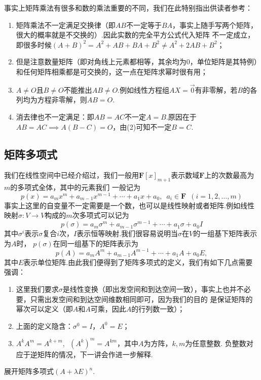 事实上矩阵乘法有很多和数的乘法重要的不同，我们在此特别指出供读者参考：
\begin{enumerate}[label=(\arabic*)]
    \item 矩阵乘法不一定满足交换律（即$AB$不一定等于$BA$，事实上随手写两个矩阵，很大的概率就是不交换的）.因此实数的完全平方公式代入矩阵
    不一定成立，即很多时候$(A+B)^2=A^2+AB+BA+B^2\neq A^2+2AB+B^2$；

    \item 但是注意数量矩阵（即对角线上元素都相等，其余均为0，单位矩阵是其特例）和任何矩阵相乘都是可交换的，这一点在矩阵求幂时很有用；
    \item $A\neq O$且$B\neq O$不能推出$AB\neq O$.例如线性方程组$AX = \vec{0}$有非零解，若$B$的各列均为方程非零解，则$AB = O$.
    \item 消去律也不一定满足：即$AB = AC$不一定$A = B$.原因在于$AB=AC \implies A(B-C)=O$，由(2)可知不一定$B = C$.
\end{enumerate}

\subsection{矩阵多项式}
我们在线性空间中已经介绍过，我们一般用$\mathbf{F}[x]_{m+1}$表示数域$\mathbf{F}$上的次数最高为$m$的多项式全体，其中的元素我们
一般记为
\[p(x)=a_mx^m+a_{m-1}x^{m-1}+\cdots+a_1x+a_0,\enspace a_i\in\mathbf{F}\enspace(i=1,2,\ldots,m)\]
事实上这里的自变量不一定需要是一个数，也可以是线性映射或者矩阵.例如线性映射$\sigma:V\to V$构成的$m$次多项式可以记为
\[p(\sigma)=a_m\sigma^m+a_{m-1}\sigma^{m-1}+\cdots+a_1\sigma+a_0I\]
其中$\sigma^i$表示$\sigma$复合$i$次，$I$表示恒等映射.我们很容易说明当$\sigma$在$V$的一组基下矩阵表示为$A$时，
$p(\sigma)$在同一组基下的矩阵表示为
\[p(A)=a_mA^m+a_{m-1}A^{m-1}+\cdots+a_1A+a_0E,\]
其中$E$表示单位矩阵.由此我们便得到了矩阵多项式的定义，我们有如下几点需要强调：
\begin{enumerate}
    \item 这里我们要求$\sigma$是线性变换（即出发空间和到达空间一致），事实上也并不必要，只需出发空间和到达空间维数相同即可，因为我们的目的
    是保证矩阵的幂次可以定义（即$A$和$A$可乘，因此$A$的行列数一致）；
    \item 上面的定义隐含：$\sigma^0 = I$，$A^0=E$；
    \item $A^kA^m=A^{k+m},\enspace (A^k)^m=A^{km}$，其中$A$为方阵，$k,m$为任意整数. 负整数对应于逆矩阵的情况，下一讲会作进一步解释.
\end{enumerate}
\begin{example}
    展开矩阵多项式$(A+\lambda E)^n$.
\end{example}
\begin{solution}

\end{solution}

